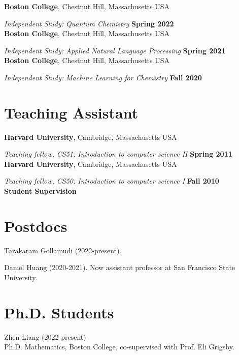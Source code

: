 \documentclass[margin,line]{res}
\begin{document}
\begin{resume}
{\bf Boston College}, Chestnut Hill, Massachusetts USA
\vspace{-.4cm}

{\em Independent Study: Quantum Chemistry} \hfill {\bf Spring 2022}\\
{\bf Boston College}, Chestnut Hill, Massachusetts USA
\vspace{-.4cm}

{\em Independent Study: Applied Natural Language Processing} \hfill {\bf Spring 2021}\\
{\bf Boston College}, Chestnut Hill, Massachusetts USA
\vspace{-.4cm}

{\em Independent Study: Machine Learning for Chemistry} \hfill {\bf Fall 2020}\\

\section{\sc Teaching Assistant}

{\bf Harvard University}, Cambridge, Massachusetts USA
\vspace{-.4cm}

{\em Teaching fellow, CS51: Introduction to computer science II} \hfill {\bf Spring 2011}\\
{\bf Harvard University}, Cambridge, Massachusetts USA

\vspace{-.4cm}
{\em Teaching fellow, CS50: Introduction to computer science I} \hfill {\bf Fall 2010}\\


\newpage
  {\bf {\Large Student Supervision}}

\section{\sc Postdocs}

Tarakaram Gollamudi (2022-present).

Daniel Huang (2020-2021). \hfill Now assistant professor at San Francisco State University.

\section{\sc Ph.D. Students}

Zhen Liang (2022-present)\\
Ph.D. Mathematics, Boston College, co-supervised with Prof. Eli Grigsby.


\end{resume}
\end{document}
